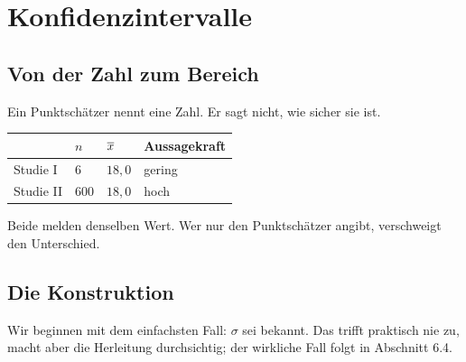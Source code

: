 \chapter{Konfidenzintervalle}

\section{Von der Zahl zum Bereich}

Ein Punktschätzer nennt eine Zahl. Er sagt nicht, wie sicher sie ist.

\begin{merksatz}
\begin{center}
\renewcommand{\arraystretch}{1.5}
\begin{tabular}{@{}P{2.2cm}P{1.6cm}P{1.8cm}P{2.6cm}@{}}
\toprule
& $n$ & $\overline{x}$ & \textbf{Aussagekraft}\\
\midrule
Studie I & $6$ & $18{,}0$ & \textcolor{akzent}{gering}\\
Studie II & $600$ & $18{,}0$ & \textcolor{gruen}{hoch}\\
\bottomrule
\end{tabular}
\end{center}

Beide melden denselben Wert. Wer nur den Punktschätzer angibt, verschweigt den Unterschied.

\begin{center}
\begin{minipage}{0.88\textwidth}
\end{minipage}
\end{center}
\end{merksatz}

\section{Die Konstruktion}

Wir beginnen mit dem einfachsten Fall: $\sigma$ sei bekannt. Das trifft praktisch nie zu, macht aber die Herleitung durchsichtig; der wirkliche Fall folgt in Abschnitt 6.4.

